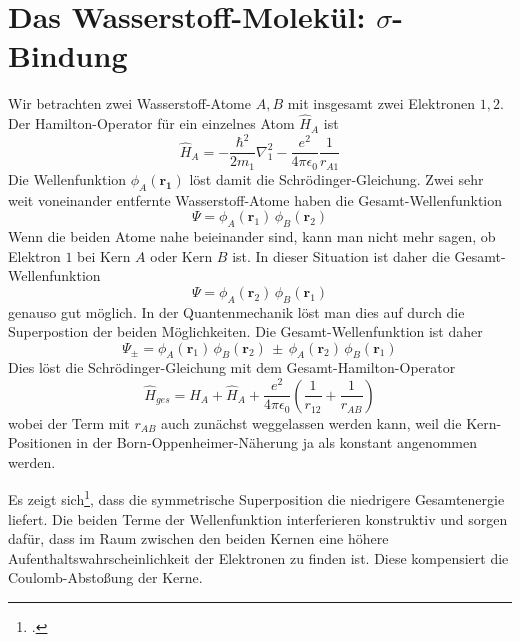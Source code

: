 \section{Das Wasserstoff-Molekül: $\sigma$-Bindung}


Wir betrachten zwei Wasserstoff-Atome $A,B$ mit insgesamt zwei Elektronen $1,2$. Der Hamilton-Operator für ein einzelnes Atom $\hat{H}_A$ ist
\begin{equation}
  \hat{H}_A = - \frac{\hbar^2}{2 m_1} \nabla_1^2 - \frac{e^2}{4 \pi \epsilon_0} \frac{1}{r_{A1}}
\end{equation}
Die Wellenfunktion $\phi_A(\mathbf{r_1})$ löst damit die Schrödinger-Gleichung. Zwei sehr weit voneinander entfernte Wasserstoff-Atome haben die Gesamt-Wellenfunktion
\begin{equation}
 \Psi = \phi_A(\mathbf{r}_1) \, \phi_B(\mathbf{r}_2)
\end{equation}
Wenn die beiden Atome nahe beieinander sind, kann man nicht mehr sagen, ob Elektron $1$ bei Kern $A$ oder Kern $B$ ist. In dieser Situation ist daher die Gesamt-Wellenfunktion 
\begin{equation}
 \Psi = \phi_A(\mathbf{r}_2) \, \phi_B(\mathbf{r}_1)
\end{equation}
genauso gut möglich. In der Quantenmechanik löst man dies auf durch die Superpostion der beiden Möglichkeiten. Die Gesamt-Wellenfunktion  ist daher 
\begin{equation}
 \Psi_{\pm} = \phi_A(\mathbf{r}_1) \, \phi_B(\mathbf{r}_2) \, \pm \, \phi_A(\mathbf{r}_2) \, \phi_B(\mathbf{r}_1)
\end{equation}
Dies löst die Schrödinger-Gleichung mit dem Gesamt-Hamilton-Operator
\begin{equation}
  \hat{H}_{ges} =  \hat{H}_A + \hat{H}_A  + \frac{e^2}{4 \pi \epsilon_0} \left( \frac{1}{r_{12}} + \frac{1}{r_{AB}} \right)
\end{equation}
wobei der Term mit $r_{AB}$ auch zunächst weggelassen werden kann, weil die Kern-Positionen in der Born-Oppenheimer-Näherung ja als konstant angenommen werden.

Es zeigt sich\footcite[Kapitel 4.4.2]{Haken_wolf_II}, dass die symmetrische Superposition die niedrigere Gesamtenergie liefert. Die beiden Terme der Wellenfunktion interferieren konstruktiv und sorgen dafür, dass im Raum zwischen den beiden Kernen eine höhere Aufenthaltswahrscheinlichkeit der Elektronen zu finden ist. Diese kompensiert die Coulomb-Abstoßung der Kerne.

